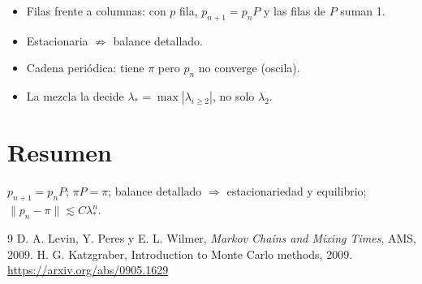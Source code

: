 \documentclass[11pt,a4paper]{article}
\begin{document}
\begin{error}
\begin{itemize}[nosep]
\item Filas frente a columnas: con $p$ fila, $p_{n+1}=p_nP$ y las filas de $P$ suman 1.
\item Estacionaria $\not\Rightarrow$ balance detallado.
\item Cadena periódica: tiene $\pi$ pero $p_n$ no converge (oscila).
\item La mezcla la decide $\lambda_*=\max|\lambda_{i\ge2}|$, no solo $\lambda_2$.
\end{itemize}
\end{error}

\section{Resumen}
$p_{n+1}=p_nP$; $\pi P=\pi$; balance detallado $\Rightarrow$ estacionariedad y equilibrio; $\|p_n-\pi\|\lesssim C\lambda_*^n$.

\begin{thebibliography}{9}\small
{} D. A. Levin, Y. Peres y E. L. Wilmer, \emph{Markov Chains and Mixing Times}, AMS, 2009.
 H. G. Katzgraber, Introduction to Monte Carlo methods, 2009. \url{https://arxiv.org/abs/0905.1629}
\end{thebibliography}
\end{document}

